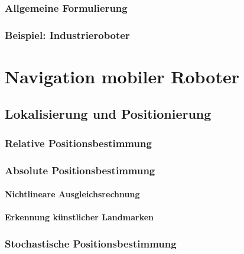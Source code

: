 \documentclass[a4paper, 11pt, accentcolor = tud3b]{tudreport}
\begin{document}
			\subsection{Allgemeine Formulierung} %

			\subsection{Beispiel: Industrieroboter} %

	\chapter{Navigation mobiler Roboter} %

		\section{Lokalisierung und Positionierung} %

			\subsection{Relative Positionsbestimmung} %

			\subsection{Absolute Positionsbestimmung} %

				\subsubsection{Nichtlineare Ausgleichsrechnung} %

				\subsubsection{Erkennung künstlicher Landmarken} %

			\subsection{Stochastische Positionsbestimmung} %
\end{document}
